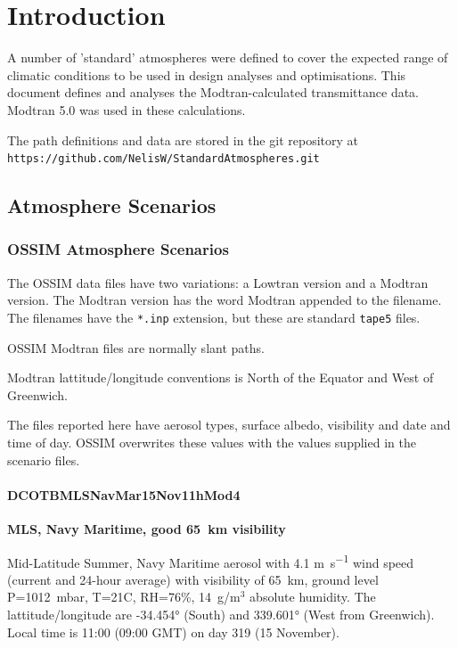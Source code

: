 \documentclass{workpackage}
\begin{document}
\WPlayout
\tableofcontents

\chapter{Introduction}

A number of 'standard' atmospheres were defined to cover the expected range of climatic conditions to be used in design analyses and optimisations.  This document defines and analyses the Modtran-calculated transmittance data.  Modtran 5.0 was used in these calculations.

The path definitions and data are stored in the git repository at\\
\verb+https://github.com/NelisW/StandardAtmospheres.git+


\section{Atmosphere Scenarios}
\label{sec:AtmosphereScenarios}


\subsection{OSSIM Atmosphere Scenarios}
\label{sec:OSSIMAtmosphereScenarios}

The OSSIM data files have two variations: a Lowtran version and a Modtran version. The Modtran version has the word Modtran appended to the filename.  The filenames have the \lstinline{*.inp} extension, but these are standard \lstinline{tape5} files.

OSSIM Modtran files are normally slant paths.

Modtran  lattitude/longitude conventions is North of the Equator and West of Greenwich.

The files reported here have aerosol types, surface albedo, visibility and date and time of day. OSSIM overwrites these values with the values supplied in the scenario files.

\subsubsection{DCOTBMLSNavMar15Nov11hMod4}
\label{sec:DCOTBMLSNavMar15Nov11hMod4}

\textbf{MLS, Navy Maritime, good 65~\si{\kilo\metre} visibility}

Mid-Latitude Summer, Navy Maritime aerosol with 4.1 \si{\metre\per\second} wind speed (current and 24-hour average) with visibility of 65~\si{\kilo\metre},
ground level P=1012~mbar, T=21C, RH=76\%, 14~g/m$^3$ absolute humidity.
The lattitude/longitude are -34.454\si{\degree} (South) and 339.601\si{\degree} (West from Greenwich).
Local time is 11:00 (09:00 GMT) on day 319 (15 November).
\end{document}
